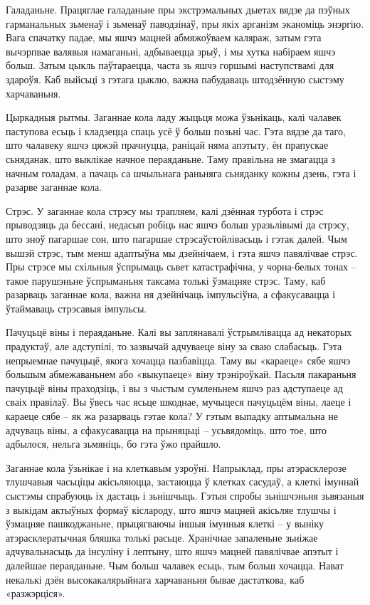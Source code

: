 Галаданьне. Працяглае галаданьне пры экстрэмальных дыетах вядзе да пэўных гарманальных зьменаў і зьменаў паводзінаў, пры якіх арганізм эканоміць энэргію. Вага спачатку падае, мы яшчэ мацней абмяжоўваем каляраж, затым гэта вычэрпвае валявыя намаганьні, адбываецца зрыў, і мы хутка набіраем яшчэ больш. Затым цыкль паўтараецца, часта зь яшчэ горшымі наступствамі для здароўя. Каб выйсьці з гэтага цыклю, важна пабудаваць штодзённую сыстэму харчаваньня.

Цыркадныя рытмы. Заганнае кола ладу жыцьця можа ўзьнікаць, калі чалавек паступова есьць і кладзецца спаць усё ў больш позьні час. Гэта вядзе да таго, што чалавеку яшчэ цяжэй прачнуцца, раніцай няма апэтыту, ён прапускае сьняданак, што выклікае начное пераяданьне. Таму правільна не змагацца з начным голадам, а пачаць са шчыльнага раньняга сьняданку кожны дзень, гэта і разарве заганнае кола.

Стрэс. У заганнае кола стрэсу мы трапляем, калі дзённая турбота і стрэс прыводзяць да бессані, недасып робіць нас яшчэ больш уразьлівымі да стрэсу, што зноў пагаршае сон, што пагаршае стрэсаўстойлівасьць і гэтак далей. Чым вышэй стрэс, тым менш адаптыўна мы дзейнічаем, і гэта яшчэ павялічвае стрэс. Пры стрэсе мы схільныя ўспрымаць сьвет катастрафічна, у чорна-белых тонах – такое парушэньне ўспрыманьня таксама толькі ўзмацняе стрэс. Таму, каб разарваць заганнае кола, важна ня дзейнічаць імпульсіўна, а сфакусавацца і ўтаймаваць стрэсавыя імпульсы.

Пачуцьцё віны і пераяданьне. Калі вы заплянавалі ўстрымлівацца ад некаторых прадуктаў, але адступілі, то зазвычай адчуваеце віну за сваю слабасьць. Гэта непрыемнае пачуцьцё, якога хочацца пазбавіцца. Таму вы «караеце» сябе яшчэ большым абмежаваньнем або «выкупаеце» віну трэніроўкай. Пасьля пакараньня пачуцьцё віны праходзіць, і вы з чыстым сумленьнем яшчэ раз адступаеце ад сваіх правілаў. Вы ўвесь час ясьце шкоднае, мучыцеся пачуцьцём віны, лаеце і караеце сябе – як жа разарваць гэтае кола? У гэтым выпадку аптымальна не адчуваць віны, а сфакусавацца на прыняцьці – усьвядоміць, што тое, што адбылося, нельга зьмяніць, бо гэта ўжо прайшло.

Заганнае кола ўзьнікае і на клеткавым узроўні. Напрыклад, пры атэрасклерозе тлушчавыя часьціцы акісьляюцца, застаюцца ў клетках сасудаў, а клеткі імуннай сыстэмы спрабуюць іх дастаць і зьнішчыць. Гэтыя спробы зьнішчэньня зьвязаныя з выкідам актыўных формаў кіслароду, што яшчэ мацней акісьляе тлушчы і ўзмацняе пашкоджаньне, прыцягваючы іншыя імунныя клеткі – у выніку атэрасклератычная бляшка толькі расьце. Хранічнае запаленьне зьніжае адчувальнасьць да інсуліну і лептыну, што яшчэ мацней павялічвае апэтыт і далейшае пераяданьне. Чым больш чалавек есьць, тым больш хочацца. Нават некалькі дзён высокакалярыйнага харчаваньня бывае дастаткова, каб «разжэрціся».

